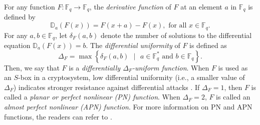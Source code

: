 \documentclass[pdflatex,sn-mathphys-num]{sn-jnl}%
\theoremstyle{thmstyleone}%
\theoremstyle{thmstyletwo}%
\theoremstyle{thmstylethree}%
\begin{document}
\vskip 1pt
For any function $F:\mathbb{F}_{q}\rightarrow\mathbb{F}_{q}$, the \textit{derivative function} of $F$ at an element $a$ in $\mathbb{F}_{q}$  is defined by
\begin{equation*}
    \mathbb{D}_{a}(F(x))= F(x+a)-F(x),\text{ for all }x\in\mathbb{F}_{q}.
\end{equation*}
For any $a,b\in\mathbb{F}_{q}$, let $\delta_{F}(a,b)$ denote the number of solutions to the differential equation $\mathbb{D}_{a}(F(x))=b$. The \textit{differential uniformity} of $F$ is defined as   
\begin{equation*}
    \Delta_{F}= \operatorname{max}\left\{\delta_{F}(a,b)\text{ }|\text{ }a\in\mathbb{F}_{q}^{*}\text{ and }b\in\mathbb{F}_{q}\right\}.
\end{equation*}
Then, we say that $F$ is a \textit{differentially $\Delta_{F}$-uniform function}. When $F$ is used as an $S$-box in a cryptosystem, low differential uniformity (i.e., a smaller value of $\Delta_{F}$) indicates stronger resistance against differential attacks \cite{Biham1,Biham2}. If $\Delta_{F}=1$, then $F$ is called a \textit{planar or perfect nonlinear (PN) function}. When $\Delta_{F}=2$, $F$ is called an \textit{almost perfect nonlinear (APN) function}. For more information on PN and APN functions, the readers can refer to \cite{PN2,PN3,PN4,PN5}.
\end{document}

